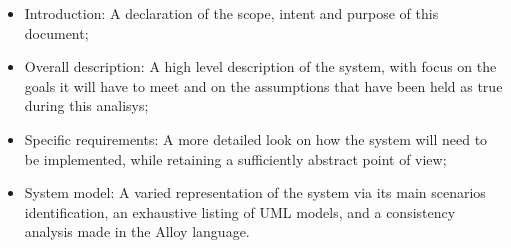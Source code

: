 \begin{itemize}

\item Introduction: A declaration of the scope, intent and purpose of this document;
\item Overall description: A high level description of the system, with focus on the goals it will have to meet and on the assumptions that have been held as true during this analisys;
\item Specific requirements: A more detailed look on how the system will need to be implemented, while retaining a sufficiently abstract point of view;
\item System model: A varied representation of the system via its main scenarios identification, an exhaustive listing of UML models, and a consistency analysis made in the Alloy language.

\end{itemize}

